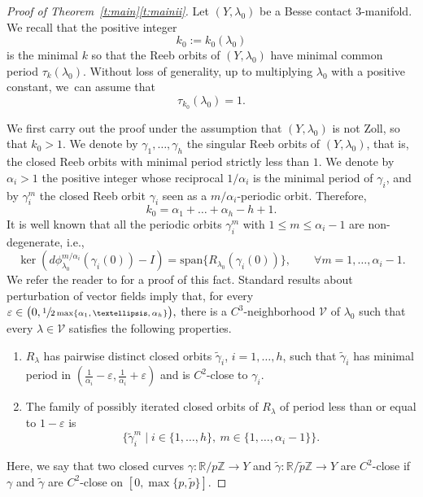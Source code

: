 \documentclass[11pt]{article}
\newcommand{\ie}{i.e.,\xspace}
\numberwithin{equation}{section}
\let\mathds\mathbb
\let\epsilon\varepsilon
\newenvironment{enumeratei}
{\bgroup\def\theenumi{\roman{enumi}}\def\theenumii{\arabic{enumii}}\begin{enumerate}}
{\end{enumerate}\egroup}
\theoremstyle{definition}
\newcommand{\Z}{\mathds{Z}}
\newcommand{\R}{\mathds{R}}
\newcommand{\VV}{\mathcal{V}}
\let\diff d
\begin{document}
\begin{proof}[Proof of Theorem~\ref{t:main}\eqref{t:mainii}]
Let $(Y,\lambda_0)$ be a Besse contact $3$-manifold. We recall that the positive integer\vspace*{-3pt}
\[
k_0:=k_0(\lambda_0)
\]
is the minimal $k$ so that the Reeb orbits of $(Y,\lambda_0)$ have minimal common period $\tau_k(\lambda_0)$. Without loss of generality, up to multiplying $\lambda_0$ with a positive constant, we~can assume that\vspace*{-3pt}
\[
\tau_{k_0}(\lambda_0)=1.
\]

We first carry out the proof under the assumption that $(Y,\lambda_0)$ is not Zoll, so that $k_0>1$. We denote by $\gamma_1,\dots,\gamma_h$ the singular Reeb orbits of $(Y,\lambda_0)$, that is, the closed Reeb orbits with minimal period strictly less than $1$.
We denote by $\alpha_i>1$ the positive integer whose reciprocal $1/\alpha_i$ is the minimal period of $\gamma_i$,
and by $\gamma_i^m$ the closed Reeb orbit $\gamma_i$ seen as a $m/\alpha_i$-periodic orbit. Therefore,\vspace*{-3pt}
\begin{equation}
\label{e:k_nonZoll}
k_0 = \alpha_1+\dots+\alpha_h - h + 1.
\end{equation}
It is well known that all the periodic orbits $\gamma_i^m$ with $1\leq m\leq \alpha_i-1$ are non-degenerate, \ie\vspace*{-3pt}
\[
\ker(\diff\phi_{\lambda_0}^{m/\alpha_i}(\gamma_i(0))-I)=\mathrm{span}\{R_{\lambda_0}(\gamma_i(0))\},\qquad\forall m=1,\dots,\alpha_i-1.
\]
We refer the reader to \cite[\S 4.1]{Cristofaro-Gardiner:2020aa} for a proof of this fact.
Standard results about perturbation of vector fields imply that, for every
$
\epsilon\in\big(0,\sfrac1{2\max\{\alpha_1,\dots,\alpha_h\}}\big),
$
there is a $C^3$-neighborhood $\VV$ of $\lambda_0$ such that every $\lambda\in\VV$ satisfies the following properties.

\begin{enumeratei}
\item\label{enum2:i}
$R_{\lambda}$ has pairwise distinct closed orbits $\tilde\gamma_i$, $i=1,\dots,h$, such that $\tilde{\gamma}_i$ has minimal period in $(\tfrac1{\alpha_i}-\epsilon,\tfrac1{\alpha_i}+\epsilon)$ and is $C^2$-close to $\gamma_i$.
\item\label{enum2:ii}
The family of possibly iterated closed orbits of $R_{\lambda}$ of period less than or equal to $1-\epsilon$ is
\[
\big\{ \tilde\gamma_i^m\mid i\in\{1,\dots,h\},\ m\in\{1,\dots,\alpha_i-1\} \big\}.
\]
\end{enumeratei}
Here, we say that two closed curves $\gamma:\R/p\Z \to Y$ and $\tilde{\gamma}:\R/\tilde{p} \Z \to Y$ are $C^2$-close if $\gamma$ and $\tilde{\gamma}$ are $C^2$-close on $[0,\max\{p,\tilde{p}\}]$.


\end{proof}
\end{document}
